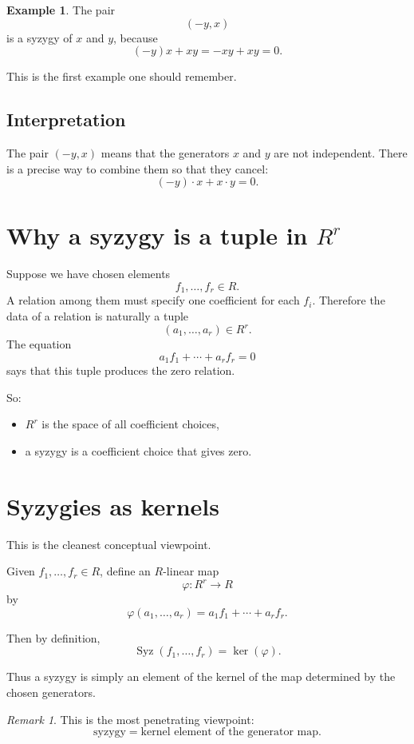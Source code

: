 \documentclass[11pt]{article}
\theoremstyle{definition}
\newtheorem{example}[theorem]{Example}
\theoremstyle{remark}
\newtheorem{remark}[theorem]{Remark}
\newcommand{\Syz}{\operatorname{Syz}}
\newcommand{\kerR}{\operatorname{ker}}
\begin{document}
	\begin{example}
		The pair
		\[
		(-y,x)
		\]
		is a syzygy of \(x\) and \(y\), because
		\[
		(-y)x+xy=-xy+xy=0.
		\]
	\end{example}
	
	This is the first example one should remember.
	
	\subsection*{Interpretation}
	
	The pair \((-y,x)\) means that the generators \(x\) and \(y\) are not independent. There is a precise way to combine them so that they cancel:
	\[
	(-y)\cdot x + x\cdot y = 0.
	\]
	
	\section{Why a syzygy is a tuple in \(R^r\)}
	
	Suppose we have chosen elements
	\[
	f_1,\dots,f_r\in R.
	\]
	A relation among them must specify one coefficient for each \(f_i\). Therefore the data of a relation is naturally a tuple
	\[
	(a_1,\dots,a_r)\in R^r.
	\]
	The equation
	\[
	a_1f_1+\cdots+a_rf_r=0
	\]
	says that this tuple produces the zero relation.
	
	So:
	
	\begin{itemize}[leftmargin=2em]
		\item \(R^r\) is the space of all coefficient choices,
		\item a syzygy is a coefficient choice that gives zero.
	\end{itemize}
	
	\section{Syzygies as kernels}
	
	This is the cleanest conceptual viewpoint.
	
	Given \(f_1,\dots,f_r\in R\), define an \(R\)-linear map
	\[
	\varphi:R^r\to R
	\]
	by
	\[
	\varphi(a_1,\dots,a_r)=a_1f_1+\cdots+a_rf_r.
	\]
	
	Then by definition,
	\[
	\Syz(f_1,\dots,f_r)=\kerR(\varphi).
	\]
	
	Thus a syzygy is simply an element of the kernel of the map determined by the chosen generators.
	
	\begin{remark}
		This is the most penetrating viewpoint:
		\[
		\text{syzygy}=\text{kernel element of the generator map}.
		\]
	\end{remark}
	
\end{document}
